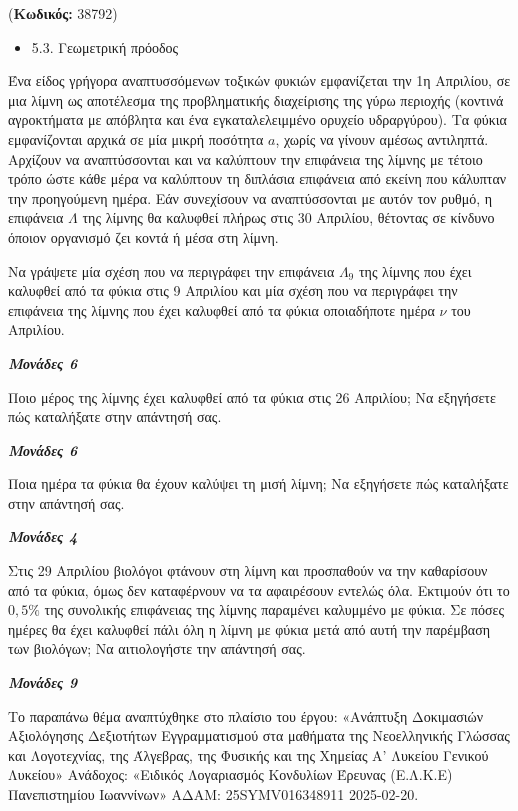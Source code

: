 \documentclass[11pt,a4paper,twoside]{book}
\newcounter{askhsh}[chapter]
\renewcommand{\theaskhsh}{
	\bf{\titlefont{\Large{\thechapter}}.\arabic{askhsh}}
}
\newcommand{\Askhsh}[2]{\refstepcounter{askhsh}{\titlefont{Άσκηση\theaskhsh} - \textcolor{maincolor}{ΘΕΜΑ #2}} ({\small{\textbf{Κωδικός:} #1}})\\}{}
\newenvironment{ylh}{
\begin{tcolorbox}[
breakable,
enhanced standard,
titlerule=0pt,
toprule=0pt, 
rightrule=0pt, 
bottomrule=0pt,
title={\titlefont Ύλη άσκησης},
colback=white,
opacityback=0,
left=2mm,
top=1mm,
bottom=0mm,
boxrule=0pt,
colframe=white,
borderline west={1.5mm}{0pt}{secondarycolor},
leftrule=2mm,
sharp corners,
coltitle=black
]
\begin{itemize}[leftmargin=3mm, itemsep=0mm, label=\textcolor{secondarycolor}{{\small\faBook}}]
}{
\end{itemize}
\end{tcolorbox}
}
\newcommand{\monades}[1]{
\hspace*{\fill}
\textbf{\textit{\textcolor{maincolor}{Μονάδες #1}}}}
\begin{document}
\vspace{4mm}
\Askhsh{38792}{4}
\begin{ylh}
    \item 5.3. Γεωμετρική πρόοδος
\end{ylh}

Ένα είδος γρήγορα αναπτυσσόμενων τοξικών φυκιών εμφανίζεται την 1η Απριλίου, σε μια λίμνη ως αποτέλεσμα της προβληματικής διαχείρισης της γύρω περιοχής (κοντινά αγροκτήματα με απόβλητα και ένα εγκαταλελειμμένο ορυχείο υδραργύρου). Τα φύκια εμφανίζονται αρχικά σε μία μικρή ποσότητα $a$, χωρίς να γίνουν αμέσως αντιληπτά. Αρχίζουν να αναπτύσσονται και να καλύπτουν την επιφάνεια της λίμνης με τέτοιο τρόπο ώστε κάθε μέρα να καλύπτουν τη διπλάσια επιφάνεια από εκείνη που κάλυπταν την προηγούμενη ημέρα. Εάν συνεχίσουν να αναπτύσσονται με αυτόν τον ρυθμό, η επιφάνεια $\Lambda$ της λίμνης θα καλυφθεί πλήρως στις 30 Απριλίου, θέτοντας σε κίνδυνο όποιον οργανισμό ζει κοντά ή μέσα στη λίμνη.

\begin{alist}
\item Να γράψετε μία σχέση που να περιγράφει την επιφάνεια $\Lambda_{9}$ της λίμνης που έχει καλυφθεί από τα φύκια στις 9 Απριλίου και μία σχέση που να περιγράφει την επιφάνεια της λίμνης που έχει καλυφθεί από τα φύκια οποιαδήποτε ημέρα $\nu$ του Απριλίου.
\monades{6}
\item Ποιο μέρος της λίμνης έχει καλυφθεί από τα φύκια στις 26 Απριλίου; Να εξηγήσετε πώς καταλήξατε στην απάντησή σας.
\monades{6}
\item Ποια ημέρα τα φύκια θα έχουν καλύψει τη μισή λίμνη; Να εξηγήσετε πώς καταλήξατε στην απάντησή σας.
\monades{4}
\item Στις 29 Απριλίου βιολόγοι φτάνουν στη λίμνη και προσπαθούν να την καθαρίσουν από τα φύκια, όμως δεν καταφέρνουν να τα αφαιρέσουν εντελώς όλα. Εκτιμούν ότι το 0$,5\%$ της συνολικής επιφάνειας της λίμνης παραμένει καλυμμένο με φύκια. Σε πόσες ημέρες θα έχει καλυφθεί πάλι όλη η λίμνη με φύκια μετά από αυτή την παρέμβαση των βιολόγων; Να αιτιολογήστε την απάντησή σας.
\monades{9}

{\footnotesize Το παραπάνω θέμα αναπτύχθηκε στο πλαίσιο του έργου: «Ανάπτυξη Δοκιμασιών Αξιολόγησης Δεξιοτήτων Εγγραμματισμού στα μαθήματα της Νεοελληνικής Γλώσσας και Λογοτεχνίας, της Άλγεβρας, της Φυσικής και της Χημείας Α' Λυκείου Γενικού Λυκείου» Ανάδοχος: «Ειδικός Λογαριασμός Κονδυλίων Έρευνας (Ε.Λ.Κ.Ε) Πανεπιστημίου Ιωαννίνων» ΑΔΑΜ: 25SYMV016348911 2025-02-20.}
\end{alist}
\end{document}
